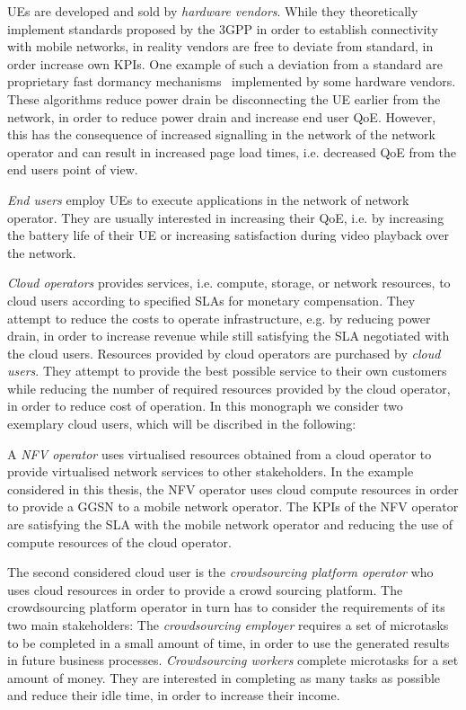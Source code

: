 
\glspl{UE} are developed and sold by \emph{hardware vendors}.
While they theoretically implement standards proposed by the \gls{3GPP} in order to establish connectivity with mobile networks, in reality vendors are free to deviate from standard, in order increase own \glspl{KPI}.
One example of such a deviation from a standard are proprietary fast dormancy mechanisms~\cite{GSM2010} implemented by some hardware vendors.
These algorithms reduce power drain be disconnecting the \gls{UE} earlier from the network, in order to reduce power drain and increase end user \gls{QoE}.
However, this has the consequence of increased signalling in the network of the network operator and can result in increased page load times, i.e. decreased \gls{QoE} from the end users point of view.

\emph{End users} employ \glspl{UE} to execute applications in the network of network operator. 
They are usually interested in increasing their \gls{QoE}, i.e. by increasing the battery life of their \gls{UE} or increasing satisfaction during video playback over the network.

\emph{Cloud operators} provides services, i.e. compute, storage, or network resources, to cloud users according to specified \glspl{SLA} for monetary compensation. 
They attempt to reduce the costs to operate infrastructure, e.g. by reducing power drain, in order to increase revenue while still satisfying the \gls{SLA} negotiated with the cloud users.
Resources provided by cloud operators are purchased by \emph{cloud users}.
They attempt to provide the best possible service to their own customers while reducing the number of required resources provided by the cloud operator, in order to reduce cost of operation. In this monograph we consider two exemplary cloud users, which will be discribed in the following:

A \emph{\gls{NFV} operator} uses virtualised resources obtained from a cloud operator to provide virtualised network services to other stakeholders.
In the example considered in this thesis, the \gls{NFV} operator uses cloud compute resources in order to provide a \gls{GGSN} to a mobile network operator.
The \glspl{KPI} of the \gls{NFV} operator are satisfying the \gls{SLA} with the mobile network operator and reducing the use of compute resources of the cloud operator.

The second considered cloud user is the \emph{crowdsourcing platform operator} who uses cloud resources in order to provide a crowd sourcing platform.
The crowdsourcing platform operator in turn has to consider the requirements of its two main stakeholders:
The \emph{crowdsourcing employer} requires a set of microtasks to be completed in a small amount of time, in order to use the generated results in future business processes. 
\emph{Crowdsourcing workers} complete microtasks for a set amount of money.
They are interested in completing as many tasks as possible and reduce their idle time, in order to increase their income.

